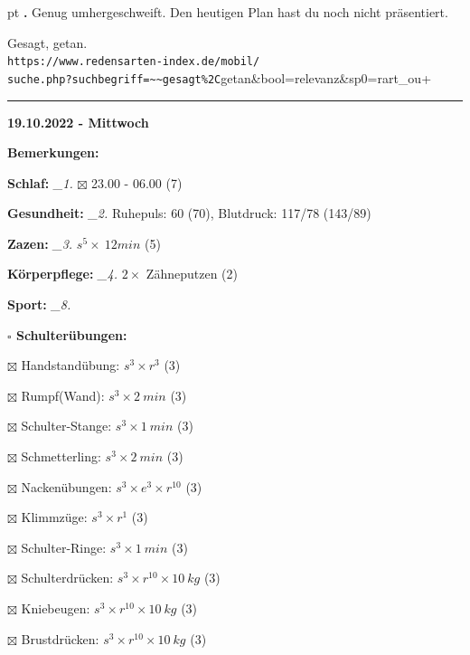 \documentclass[10pt,a4paper]{article}
\newcounter{notec}
\newcommand\notep[1]{%
  \stepcounter{notec}
  \vskip #1pt
  {\bf\arabic{notec}.}
}
\newcommand\prop[1] {{\color {alizarin} {\bf #1}}}        %
\newcommand\rele[1] {{\color {english} \bf {#1}}}         %
\newcommand\mand[1] {{\color {burntorange} {\bf #1}}}     %
\newcommand\ddivide {\vskip -9pt \hrule \vskip 6pt}
\newcommand\topspace{\vskip -15pt \hskip 20pt}
\newcommand\n[1] { {\sl #1.} \hskip 5pt }
\begin{document}
\begin{mdframed}[style=daystyle]
  \notep 4 Genug umhergeschweift. Den heutigen Plan hast du noch nicht präsentiert.

  \vskip 2pt
  Gesagt, getan. \\
  \verb+https://www.redensarten-index.de/mobil/+ \\
  \verb+suche.php?suchbegriff=~~gesagt%2C+getan\&bool=relevanz\&sp0=rart\_ou+


\end{mdframed}


\ddivide
{\rele {19.10.2022 - Mittwoch}}

\begin{mdframed}[style=daystyle]
  \begin{labeling}{{\mand {Bemerkungen:}}}
    \setlength\itemsep{-3pt}
  \item[{\mand {Schlaf:}}]        \n{\_1} $\boxtimes$ 23.00 - 06.00 (7)
  \item[{\mand {Gesundheit:}}]    \n{\_2} Ruhepuls: 60 (70), Blutdruck: 117/78 (143/89)
  \item[{\mand {Zazen:}}]         \n{\_3} $s^5 \times\ 12 min$ (5)
  \item[{\mand {Körperpflege:}}]  \n{\_4} $2 \times$ Zähneputzen (2)
  \item[{\mand {Sport:}}]         \n{\_8}
    \topspace
    \begin{minipage}{0.75\textwidth}  
      \begin{labeling}{\prop {$\square$ {Schulterübungen:}}} 
        \setlength\itemsep{-3pt}
      \item[$\boxtimes$ Handstandübung:]  $s^3 \times r^{3}$ (3)
      \item[$\boxtimes$ Rumpf(Wand):]     $s^3 \times 2\ min$ (3)
      \item[$\boxtimes$ Schulter-Stange:] $s^3 \times 1\ min$ (3)
      \item[$\boxtimes$ Schmetterling:]   $s^3 \times 2\ min$ (3)
      \item[$\boxtimes$ Nackenübungen:]   $s^3 \times e^3 \times r^{10}$ (3)
      \item[$\boxtimes$ Klimmzüge:]       $s^3 \times r^1$ (3)
      \item[$\boxtimes$ Schulter-Ringe:]  $s^3 \times 1\ min$ (3)
      \item[$\boxtimes$ Schulterdrücken:] $s^3 \times r^{10} \times 10\ kg$ (3)
      \item[$\boxtimes$ Kniebeugen:]      $s^3 \times r^{10} \times 10\ kg$ (3)
      \item[$\boxtimes$ Brustdrücken:]    $s^3 \times r^{10} \times 10\ kg$ (3)

\end{labeling}
\end{minipage}
\end{labeling}
\end{mdframed}
\end{document}
